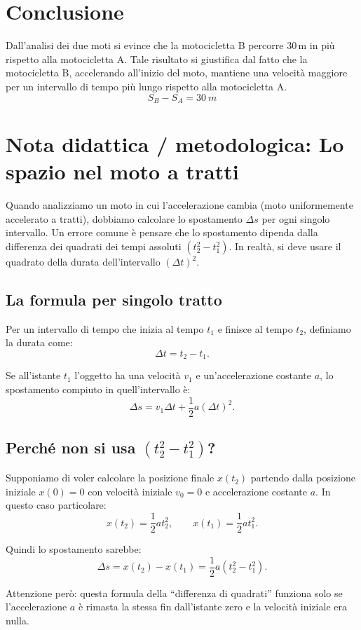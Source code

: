 \documentclass[a4paper,11pt]{article}
\begin{document}
\section{Conclusione}
Dall’analisi dei due moti si evince che la motocicletta B percorre $30\,\text{m}$ in più rispetto alla motocicletta A. Tale risultato si giustifica dal fatto che la motocicletta B,
accelerando all’inizio del moto, mantiene una velocità maggiore per un intervallo di tempo più lungo rispetto alla motocicletta A.
\[
\boxed{S_B - S_A = 30~\si{m}}
\]
\newpage
\section{Nota didattica / metodologica: Lo spazio nel moto a tratti}
Quando analizziamo un moto in cui l'accelerazione cambia (moto uniformemente accelerato a tratti), dobbiamo calcolare lo spostamento $\Delta s$ per ogni singolo intervallo.
Un errore comune è pensare che lo spostamento dipenda dalla differenza dei quadrati dei tempi assoluti
$(t_2^2 - t_1^2)$.
In realtà, si deve usare il quadrato della durata dell'intervallo $(\Delta t)^2$.

\subsection{La formula per singolo tratto}

Per un intervallo di tempo che inizia al tempo $t_1$ e finisce al tempo $t_2$, definiamo la durata come:
\[
\Delta t = t_2 - t_1.
\]

Se all'istante $t_1$ l'oggetto ha una velocità $v_1$ e un'accelerazione costante $a$, lo spostamento compiuto in quell'intervallo è:
\[
\Delta s = v_1 \Delta t + \frac{1}{2} a (\Delta t)^2.
\]

\subsection{Perché non si usa $(t_2^2 - t_1^2)$?}

Supponiamo di voler calcolare la posizione finale $x(t_2)$ partendo dalla posizione iniziale $x(0)=0$ con velocità iniziale $v_0=0$ e accelerazione costante $a$.
In questo caso particolare:
\[
x(t_2) = \frac{1}{2} a t_2^2,
\qquad
x(t_1) = \frac{1}{2} a t_1^2.
\]

Quindi lo spostamento sarebbe:
\[
\Delta s = x(t_2) - x(t_1) = \frac{1}{2} a (t_2^2 - t_1^2).
\]

Attenzione però: questa formula della ``differenza di quadrati'' funziona solo se l'accelerazione $a$ è rimasta la stessa fin dall'istante zero e la velocità iniziale era nulla.
\end{document}
